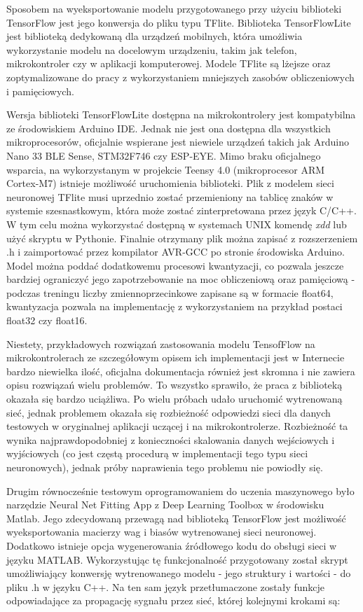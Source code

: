 \documentclass[12pt, a4paper]{article}
\begin{document}
Sposobem na wyeksportowanie modelu przygotowanego przy użyciu biblioteki TensorFlow jest jego konwersja do pliku typu TFlite. Biblioteka TensorFlowLite jest biblioteką dedykowaną dla urządzeń mobilnych, która umożliwia wykorzystanie modelu na docelowym urządzeniu, takim jak telefon, mikrokontroler czy w aplikacji komputerowej. Modele TFlite są lżejsze oraz zoptymalizowane do pracy z wykorzystaniem mniejszych zasobów obliczeniowych i pamięciowych.

Wersja biblioteki TensorFlowLite dostępna na mikrokontrolery jest kompatybilna ze środowiskiem Arduino IDE. Jednak nie jest ona dostępna dla wszystkich mikroprocesorów, oficjalnie wspierane jest niewiele urządzeń takich jak Arduino Nano 33 BLE Sense, STM32F746 czy ESP-EYE. Mimo braku oficjalnego wsparcia, na wykorzystanym w projekcie Teensy 4.0 (mikroprocesor ARM Cortex-M7) istnieje możliwość uruchomienia biblioteki. Plik z modelem sieci neuronowej TFlite musi uprzednio zostać przemieniony na tablicę znaków w systemie szesnastkowym, która może zostać zinterpretowana przez język C/C++. W tym celu można wykorzystać dostępną w systemach UNIX komendę \textit{xdd} lub użyć skryptu w Pythonie. Finalnie otrzymany plik można zapisać z rozszerzeniem .h i zaimportować przez kompilator AVR-GCC po stronie środowiska Arduino. Model można poddać dodatkowemu procesowi kwantyzacji, co pozwala jeszcze bardziej ograniczyć jego zapotrzebowanie na moc obliczeniową oraz pamięciową - podczas treningu liczby zmiennoprzecinkowe zapisane są w formacie float64, kwantyzacja pozwala na implementację z wykorzystaniem na przykład postaci float32 czy float16.

Niestety, przykładowych rozwiązań zastosowania modelu TensofFlow na mikrokontrolerach ze szczegółowym opisem ich implementacji jest w Internecie bardzo niewielka ilość, oficjalna dokumentacja również jest skromna i nie zawiera opisu rozwiązań wielu problemów. To wszystko sprawiło, że praca z biblioteką okazała się bardzo uciążliwa. Po wielu próbach udało uruchomić wytrenowaną sieć, jednak problemem okazała się rozbieżność odpowiedzi sieci dla danych testowych w oryginalnej aplikacji uczącej i na mikrokontrolerze. Rozbieżność ta wynika najprawdopodobniej z konieczności skalowania danych wejściowych i wyjściowych (co jest częstą procedurą w implementacji tego typu sieci neuronowych), jednak próby naprawienia tego problemu nie powiodły się. 

Drugim równocześnie testowym oprogramowaniem do uczenia maszynowego było narzędzie Neural Net Fitting App z Deep Learning Toolbox w środowisku Matlab. Jego zdecydowaną przewagą nad biblioteką TensorFlow jest możliwość wyeksportowania macierzy wag i biasów wytrenowanej sieci neuronowej. Dodatkowo istnieje opcja wygenerowania źródłowego kodu do obsługi sieci w języku MATLAB. Wykorzystując tę funkcjonalność przygotowany został skrypt umożliwiający konwersję wytrenowanego modelu - jego struktury i wartości - do pliku .h w języku C++. Na ten sam język przetłumaczone zostały funkcje odpowiadające za propagację sygnału przez sieć, której kolejnymi krokami są:
\end{document}
